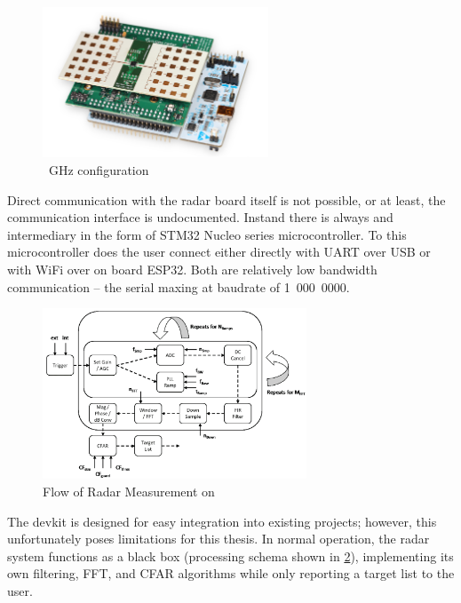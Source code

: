 \begin{figure}[h!]
  \centering
  \includegraphics[width=0.6\textwidth]{../img/sidar.png}

  \caption[\sidar \cite{sidarMANOld}]{~GHz configuration}
  \label{fig:sidar}
\end{figure}

Direct communication with the radar board itself is not possible, or at least, the communication interface is undocumented.
Instand there is always and intermediary in the form of  STM32 Nucleo series microcontroller.
To this microcontroller does the user connect either directly with UART over USB or with WiFi over on board ESP32.
Both are relatively low bandwidth communication -- the serial maxing at baudrate of 1~000~0000.

\begin{figure}[h!]
  \centering
  \includegraphics[width=0.7\textwidth]{../img/sidar_flow.png}
  \caption[Flow of Radar Measurement on \sidar \cite{sidarPRO}]{Flow of Radar Measurement on \sidar}
  \label{fig:sidarFlow}
\end{figure}

The devkit is designed for easy integration into existing projects; however, this unfortunately poses limitations for this thesis.
In normal operation, the radar system functions as a black box (processing schema shown in \ref{fig:sidarFlow}), implementing its own filtering, FFT, and CFAR algorithms while only reporting a target list to the user.

